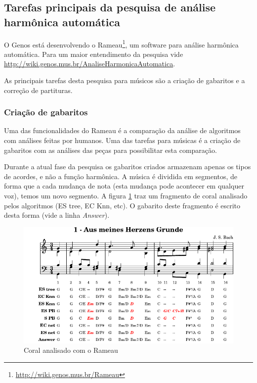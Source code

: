 \documentclass[12pt,brazil]{book}
\newcommand{\eng}[1]{\textit{#1}}
\begin{document}
\subsection{Tarefas principais da pesquisa de análise harmônica automática}
\label{sec:taref-princ-da}

O Genos está desenvolvendo o
Rameau\footnote{\url{http://wiki.genos.mus.br/Rameau}}, um software
para análise harmônica automática. Para um maior entendimento da
pesquisa vide
\url{http://wiki.genos.mus.br/AnaliseHarmonicaAutomatica}.

As principais tarefas desta pesquisa para músicos são a criação de
gabaritos e a correção de partituras.

\subsubsection{Criação de gabaritos}
\label{sec:criacao-de-gabaritos}

Uma das funcionalidades do Rameau é a comparação da análise de
algoritmos com análises feitas por humanos. Uma das tarefas para
músicas é a criação de gabaritos com as análises das peças para
possibilitar esta comparação.

Durante a atual fase da pesquisa os gabaritos criados armazenam apenas
os tipos de acordes, e não a função harmônica. A música é dividida em
segmentos, de forma que a cada mudança de nota (esta mudança pode
acontecer em qualquer voz), temos um novo segmento. A figura
\ref{fig:choral-rameau} traz um fragmento de coral analisado pelos
algoritmos (ES tree, EC Knn, etc). O gabarito deste fragmento é
escrito desta forma (vide a linha \eng{Answer}).

\begin{figure}
  \centering
  \includegraphics[scale=.8]{analysis-001}
  \caption{Coral analisado com o Rameau}
  \label{fig:choral-rameau}
\end{figure}
\end{document}
